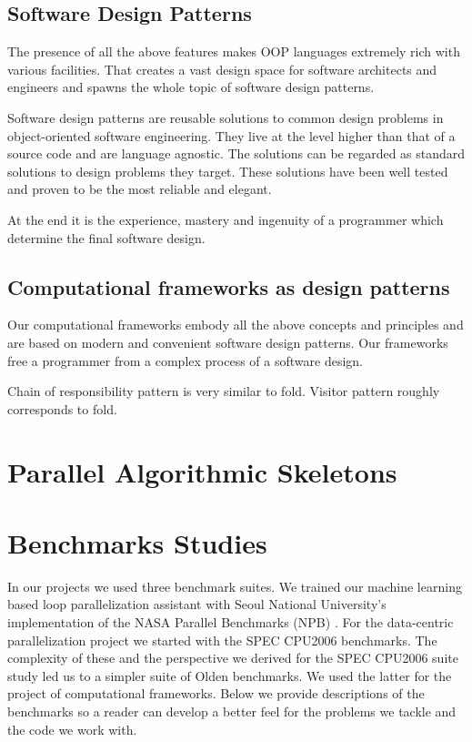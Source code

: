 \subsection{Software Design Patterns}
\label{background_design}
\quad The presence of all the above features makes OOP languages extremely rich with various facilities. That creates a vast design space for software architects and engineers and spawns the whole topic of software design patterns.  

\quad Software design patterns are reusable solutions to common design problems in object-oriented software engineering. They live at the level higher than that of a source code and are language agnostic. The solutions can be regarded as standard solutions to design problems they target. These solutions have been well tested and proven to be the most reliable and elegant.

\quad At the end it is the experience, mastery and ingenuity of a programmer which determine the final software design.  

\subsection{Computational frameworks as design patterns }
\label{background_design_frameworks}
\quad Our computational frameworks embody all the above concepts and principles and are based on modern and convenient software design patterns. Our frameworks free a programmer from a complex process of a software design.  

Chain of responsibility pattern is very similar to fold.
Visitor pattern roughly corresponds to fold.

\section{Parallel Algorithmic Skeletons}

\section{Benchmarks Studies}
\label{background_benchmarks}
\quad In our projects we used three benchmark suites. We trained our machine learning based loop parallelization assistant with Seoul National University's implementation of the NASA Parallel Benchmarks (NPB) \cite{snu-npb-benchmarks}. For the data-centric parallelization project we started with the SPEC CPU2006 benchmarks. The complexity of these and the perspective we derived for the SPEC CPU2006 suite study led us to a simpler suite of Olden benchmarks. We used the latter for the project of computational frameworks.\newline\null
\quad Below we provide descriptions of the benchmarks so a reader can develop a better feel for the problems we tackle and the code we work with.\newline\null
